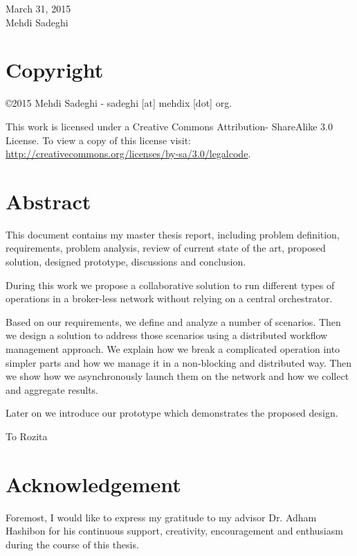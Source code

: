 \documentclass[12pt, a4paper, oneside]{report}
\newcounter{chapter_count}
\newenvironment{dedication}
  {\clearpage           %
   \thispagestyle{empty}%
   \vspace*{\stretch{1}}%
   \itshape             %
  }
  {\par %
   \vspace{\stretch{3}} %
   \clearpage           %
  }
\begin{document}
March 31, 2015 \\

Mehdi Sadeghi

\thispagestyle{empty} 
\clearpage

\chapter*{Copyright}
\noindent
\begin{flushleft}
\copyright 2015 Mehdi Sadeghi - sadeghi [at] mehdix [dot] org.
 
This work is licensed under a Creative Commons Attribution- ShareAlike 3.0 License.
To view a copy of this license visit:
\url{http://creativecommons.org/licenses/by-sa/3.0/legalcode}.
\end{flushleft}

\thispagestyle{empty} 

\chapter*{Abstract}
This document contains my master thesis report, including problem definition, requirements, problem analysis,
review of current state of the art, proposed solution, designed prototype, discussions and conclusion.

During this work we propose a collaborative solution to run different types of operations 
in a broker-less network without relying on a central orchestrator. 

Based on our requirements, we define and analyze a number of scenarios.
Then we design a solution to address those scenarios using a distributed workflow management approach. 
We explain how we break a complicated operation into simpler parts 
and how we manage it in a non-blocking and distributed way.
Then we show how we asynchronously launch them on the network and 
how we collect and aggregate results.

Later on we introduce our prototype which demonstrates the proposed design.

\thispagestyle{empty} 
\clearpage

\begin{dedication}
To Rozita
\end{dedication}


\chapter*{Acknowledgement}
Foremost, I would like to express my gratitude to my advisor Dr. Adham Hashibon for his continuous support, creativity,
encouragement and enthusiasm during the course of this thesis.
\end{document}
